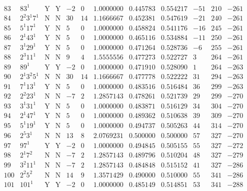 \documentclass[11pt,reqno,a4letter]{article}
\numberwithin{figure}{section}
\numberwithin{table}{section}
\theoremstyle{plain}
\numberwithin{theorem}{section}
\theoremstyle{definition}
\begin{document}
\begin{table}[ht]
\begin{equation*}
{\begin{array}{cc|cc|ccc|cc|ccc}
 83 & 83^1 & \text{Y} & \text{Y} & -2 & 0 & 1.0000000 & 0.445783 & 0.554217 & -51 & 210 & -261 \\
 84 & 2^2 3^1 7^1 & \text{N} & \text{N} & 30 & 14 & 1.1666667 & 0.452381 & 0.547619 & -21 & 240 & -261 \\
 85 & 5^1 17^1 & \text{Y} & \text{N} & 5 & 0 & 1.0000000 & 0.458824 & 0.541176 & -16 & 245 & -261 \\
 86 & 2^1 43^1 & \text{Y} & \text{N} & 5 & 0 & 1.0000000 & 0.465116 & 0.534884 & -11 & 250 & -261 \\
 87 & 3^1 29^1 & \text{Y} & \text{N} & 5 & 0 & 1.0000000 & 0.471264 & 0.528736 & -6 & 255 & -261 \\
 88 & 2^3 11^1 & \text{N} & \text{N} & 9 & 4 & 1.5555556 & 0.477273 & 0.522727 & 3 & 264 & -261 \\
 89 & 89^1 & \text{Y} & \text{Y} & -2 & 0 & 1.0000000 & 0.471910 & 0.528090 & 1 & 264 & -263 \\
 90 & 2^1 3^2 5^1 & \text{N} & \text{N} & 30 & 14 & 1.1666667 & 0.477778 & 0.522222 & 31 & 294 & -263 \\
 91 & 7^1 13^1 & \text{Y} & \text{N} & 5 & 0 & 1.0000000 & 0.483516 & 0.516484 & 36 & 299 & -263 \\
 92 & 2^2 23^1 & \text{N} & \text{N} & -7 & 2 & 1.2857143 & 0.478261 & 0.521739 & 29 & 299 & -270 \\
 93 & 3^1 31^1 & \text{Y} & \text{N} & 5 & 0 & 1.0000000 & 0.483871 & 0.516129 & 34 & 304 & -270 \\
 94 & 2^1 47^1 & \text{Y} & \text{N} & 5 & 0 & 1.0000000 & 0.489362 & 0.510638 & 39 & 309 & -270 \\
 95 & 5^1 19^1 & \text{Y} & \text{N} & 5 & 0 & 1.0000000 & 0.494737 & 0.505263 & 44 & 314 & -270 \\
 96 & 2^5 3^1 & \text{N} & \text{N} & 13 & 8 & 2.0769231 & 0.500000 & 0.500000 & 57 & 327 & -270 \\
 97 & 97^1 & \text{Y} & \text{Y} & -2 & 0 & 1.0000000 & 0.494845 & 0.505155 & 55 & 327 & -272 \\
 98 & 2^1 7^2 & \text{N} & \text{N} & -7 & 2 & 1.2857143 & 0.489796 & 0.510204 & 48 & 327 & -279 \\
 99 & 3^2 11^1 & \text{N} & \text{N} & -7 & 2 & 1.2857143 & 0.484848 & 0.515152 & 41 & 327 & -286 \\
 100 & 2^2 5^2 & \text{N} & \text{N} & 14 & 9 & 1.3571429 & 0.490000 & 0.510000 & 55 & 341 & -286 \\
 101 & 101^1 & \text{Y} & \text{Y} & -2 & 0 & 1.0000000 & 0.485149 & 0.514851 & 53 & 341 & -288 \\

\end{array}}
\end{equation*}
\end{table}
\end{document}
